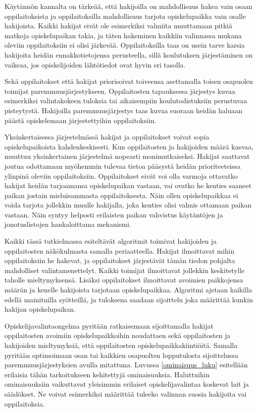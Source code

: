 \documentclass[gradu, twoside]{tktltiki}
\begin{document}
Käytännön kannalta on tärkeää, että hakijoilla on mahdollisuus hakea
vain osaan oppilaitoksista ja oppilaitoksilla mahdollisuus tarjota
opiskelupaikka vain osalle hakijoista. Kaikki hakijat eivät ole
esimerkiksi valmiita muuttamaan pitkiä matkoja opiskelupaikan takia,
ja täten hakeminen kaikkiin valinnassa mukana oleviin oppilaitoksiin
ei olisi järkevää. Oppilaitoksilla taas on usein tarve karsia
hakijoita heidän ennakkotietojensa perusteella, sillä koulutuksen
järjestäminen on vaikeaa, jos opiskelijoiden lähtötiedot ovat hyvin
eri tasolla.

Sekä oppilaitokset että hakijat priorisoivat toiveensa asettamalla
toisen osapuolen toimijat paremmuusjärjestykseen. Oppilaitosten
tapauksessa järjestys kuvaa esimerkiksi valintakokeen tuloksia tai
aikaisempiin koulutodistuksiin perustuvaa pisteytystä. Hakijoilla
paremmuusjärjestys taas kuvaa suoraan heidän haluaan päästä
opiskelemaan järjestettyihin oppilaitoksiin.

Yksinkertaisessa järjestelmässä hakijat ja oppilaitokset voivat sopia
opiskelupaikoista kahdenkeskisesti. Kun oppilaitosten ja hakijoiden
määrä kasvaa, muuttuu yksinkertainen järjestelmä nopeasti
monimutkaiseksi. Hakijat saattavat joutua odottamaan myöhemmin tulevaa
tietoa pääsystä heidän prioriteeteissa ylinpinä oleviin
oppilaitoksiin. Oppilaitokset eivät voi olla varmoja ottavatko hakijat
heidän tarjoamansa opiskelupaikan vastaan, vai ovatko he kenties
saaneet paikan jostain mieluisammasta oppilaitoksesta. Näin ollen
opiskelupaikkaa ei voida tarjota jollekkin muulle hakijalla, joka
kenties olisi valmis ottamaan paikan vastaan. Näin syntyy helposti
erilaisten paikan vahvistus käytäntöjen ja jonotuslistojen
hankaloittama mekanismi.

Kaikki tässä tutkielmassa esiteltävät algoritmit toimivat hakijoiden
ja oppilaitosten näkökulmasta samalla periaatteella. Hakijat
ilmoittavat mihin oppilaitoksiin he hakevat, ja oppilaitokset
järjestävät tämän tiedon pohjalta mahdolliset valintamenettelyt.
Kaikki toimijat ilmoittavat jollekkin keskitetylle taholle
mieltymyksensä. Lisäksi oppilaitokset ilmoittavat avoimien paikkojensa
määrän ja kenelle hakijoista tarjotaan opiskelupaikkaa. Algoritmi
ajetaan kaikilla edellä mainituilla syötteillä, ja tuloksena saadaan
sijoittelu joka määrittää kunkin hakijan opiskelupaikan.

Opiskelijavalintaongelma pyritään ratkaisemaan sijoittamalla hakijat
oppilaitosten avoimiin opiskelupaikkoihin noudattaen sekä
oppilaitosten ja hakijoiden mieltymyksiä, että oppilaitosten
opiskelupaikkakiintiöitä. Samalla pyritään optimoimaan osan tai
kaikkien osapuolten lopputulosta sijoittelussa paremmuusjärjestyksien
avulla mitattuna. Luvussa \ref{ominaisuus_luku} esitellään erilaisia
tähän tarkoitukseen kehitettyjä ominaisuuksia. Haluttuihin
ominaisuuksiin vaikuttavat yleisimmin erilaiset opiskelijavalintaa
koskevat lait ja säädökset. Ne voivat esimerkiksi määrittää tuleeko
valinnan suosia hakijoita vai oppilaitoksia.
\end{document}
